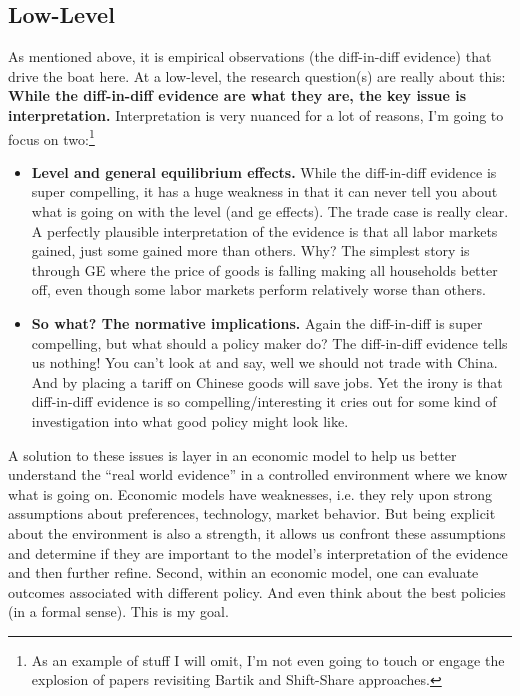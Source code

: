 \documentclass[pdftex,12pt]{article}
\begin{document}
\subsection{Low-Level}

As mentioned above, it is empirical observations (the diff-in-diff evidence) that drive the boat here. At a low-level, the research question(s) are really about this: \textbf{While the diff-in-diff evidence are what they are, the key issue is interpretation.} Interpretation is very nuanced for a lot of reasons, I'm going to focus on two:\footnote{As an example of stuff I will omit, I'm not even going to touch or engage the explosion of papers revisiting Bartik and Shift-Share approaches.}
\begin{itemize}
\item \textbf{Level and general equilibrium effects.} While the diff-in-diff evidence is super compelling, it has a huge weakness in that it can never tell you about what is going on with the level (and ge effects). The trade case is really clear. A perfectly plausible interpretation of the \citet{david2013china} evidence is that all labor markets gained, just some gained more than others. Why? The simplest story is through GE where the price of goods is falling making all households better off, even though some labor markets perform relatively worse than others.

\item \textbf{So what? The normative implications.} Again the diff-in-diff is super compelling, but what should a policy maker do? The diff-in-diff evidence tells us nothing! You can't look at \citet{david2013china} and say, well we should not trade with China. And by placing a tariff on Chinese goods will save jobs. Yet the irony is that diff-in-diff evidence is so compelling/interesting it cries out for some kind of investigation into what good policy might look like.
\end{itemize}
A solution to these issues is layer in an economic model to help us better understand the ``real world evidence'' in a controlled environment where we know what is going on. Economic models have weaknesses, i.e. they rely upon strong assumptions about preferences, technology, market behavior. But being explicit about the environment is also a strength, it allows us confront these assumptions and determine if they are important to the model's interpretation of the evidence and then further refine. Second, within an economic model, one can evaluate outcomes associated with different policy. And even think about the best policies (in a formal sense). This is my goal.
\end{document}
